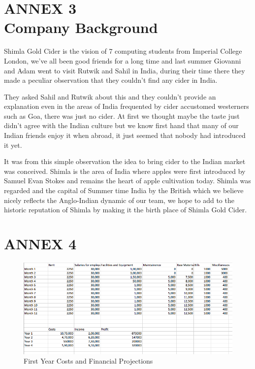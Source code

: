 \documentclass[11pt]{article}
\begin{document}
\section{ANNEX 3 \\ Company Background}
Shimla Gold Cider is the vision of 7 computing students from Imperial College
London, we've all been good friends for a long time and last summer Giovanni and
Adam went to visit Rutwik and Sahil in India, during their time there they made
a peculiar observation that they couldn't find any cider in India.

They asked Sahil and Rutwik about this and they couldn't provide an explanation
even in the areas of India frequented by cider accustomed westerners such as
Goa, there was just no cider. At first we thought maybe the taste just didn't
agree with the Indian culture but we know first hand that many of our Indian
friends enjoy it when abroad, it just seemed that nobody had introduced it yet.

It was from this simple observation the idea to bring cider to the Indian market
was conceived. Shimla is the area of India where apples were first introduced by
Samuel Evan Stokes and remains the heart of apple cultivation today. Shimla was
regarded and the capital of Summer time India by the British which we believe
nicely reflects the Anglo-Indian dynamic of our team, we hope to add to the
historic reputation of Shimla by making it the birth place of Shimla Gold Cider.

\newpage


\section{ANNEX 4}

\begin{figure}[H]
	\centering
	\caption{First Year Costs and Financial Projections}
	\includegraphics[width=\textwidth]{costs.png}
\end{figure}

\end{document}

